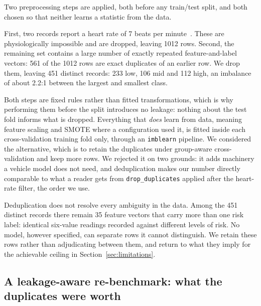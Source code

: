 Two preprocessing steps are applied, both before any train/test split, and
both chosen so that neither learns a statistic from the data.

First, two records report a heart rate of 7 beats per
minute~\citep{ahmed2020maternal}. These are
physiologically impossible and are dropped, leaving 1012 rows. Second, the
remaining set contains a large number of exactly repeated feature-and-label
vectors: 561 of the 1012 rows are exact duplicates of an earlier row. We
drop them, leaving 451 distinct records: 233 low, 106 mid and 112
high, an imbalance of about 2.2:1 between the largest and smallest class.

Both steps are fixed rules rather than fitted transformations, which is why
performing them before the split introduces no leakage: nothing about the
test fold informs what is dropped. Everything that \emph{does} learn from
data, meaning feature scaling and SMOTE where a configuration used it, is
fitted inside each cross-validation training fold only, through an
\texttt{imblearn} pipeline. We considered the alternative, which is to retain
the duplicates under group-aware cross-validation and keep more rows. We
rejected it on two grounds: it adds machinery a vehicle model does not need,
and deduplication makes our number directly comparable to what a reader gets
from \texttt{drop\_duplicates} applied after the heart-rate filter, the order
we use.

Deduplication does not resolve every ambiguity in the data. Among the 451
distinct records there remain 35 feature vectors that carry more than
one risk label: identical six-value readings recorded against different
levels of risk. No model, however specified, can separate rows it cannot
distinguish. We retain these rows rather than adjudicating between them, and
return to what they imply for the achievable ceiling in
Section~\ref{sec:limitations}.

\subsection{A leakage-aware re-benchmark: what the duplicates were worth}
\label{sec:data-leakage}

